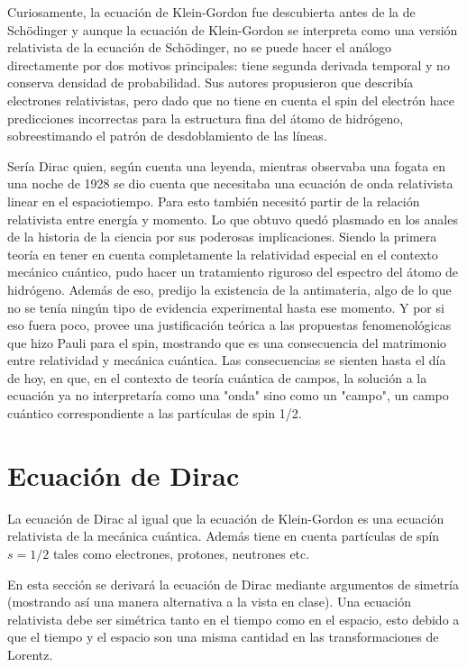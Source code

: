 \documentclass[a4paper, 12pt]{article} %
\begin{document}
Curiosamente, la ecuaci\'on de Klein-Gordon fue descubierta antes de la de  Sch\"odinger y aunque la ecuaci\'on de Klein-Gordon se interpreta como una versi\'on relativista de la ecuaci\'on de Sch\"odinger, no se puede hacer el an\'alogo directamente por dos motivos principales: tiene segunda derivada temporal y no conserva densidad de probabilidad. Sus autores propusieron que describ\'ia electrones relativistas, pero dado que no tiene en cuenta el spin del electr\'on hace predicciones incorrectas para la estructura fina del \'atomo de hidr\'ogeno, sobreestimando el patr\'on de desdoblamiento de las l\'ineas.

Ser\'ia Dirac quien, seg\'un cuenta una leyenda, mientras observaba una fogata en una noche de 1928 se dio cuenta que necesitaba una ecuaci\'on de onda relativista linear en el espaciotiempo. Para esto tambi\'en necesit\'o partir de la relaci\'on relativista entre energ\'ia y momento. Lo que obtuvo qued\'o plasmado en los anales de la historia de la ciencia por sus poderosas implicaciones. Siendo la primera teor\'ia en tener en cuenta completamente la relatividad especial en el contexto mec\'anico cu\'antico, pudo hacer un tratamiento riguroso del espectro del \'atomo de hidr\'ogeno. Adem\'as de eso, predijo la existencia de la antimateria, algo de lo que no se ten\'ia ning\'un tipo de evidencia experimental hasta ese momento. Y por si eso fuera poco, provee una justificaci\'on te\'orica a las propuestas fenomenol\'ogicas que hizo Pauli para el spin, mostrando que es una consecuencia del matrimonio entre relatividad y mec\'anica cu\'antica. Las consecuencias se sienten hasta el d\'ia de hoy, en que, en el contexto de teor\'ia cu\'antica de campos, la soluci\'on a la ecuaci\'on ya no interpretar\'ia como una "onda" sino como un "campo", un campo cu\'antico correspondiente a las part\'iculas de spin 1/2.


\section{Ecuaci\'on de Dirac}
La ecuaci\'on de Dirac al igual que la ecuaci\'on de Klein-Gordon es una 
ecuaci\'on relativista de la mec\'anica cu\'antica. Adem\'as tiene en cuenta
part\'iculas de sp\'in $s=1/2$ tales como electrones, protones, neutrones etc. 

En esta secci\'on se derivar\'a la ecuaci\'on de Dirac mediante argumentos
de simetr\'ia (mostrando as\'i una manera alternativa a la vista en clase). 
Una ecuaci\'on relativista debe ser sim\'etrica tanto en el tiempo como en el 
espacio, esto debido a que el tiempo y el espacio son una misma cantidad 
en las transformaciones de Lorentz.
\end{document}

